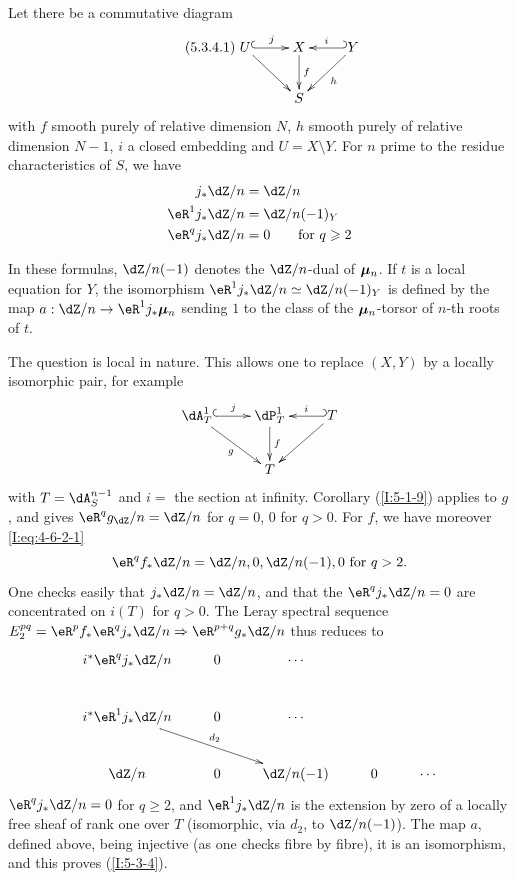 \begin{theorem}\label{I:5-3-4}
Let there be a commutative diagram
\begin{equation*}\tag{5.3.4.1}\label{I:eq:5-3-4-1}\xymatrix{
  U \ar@{^{(}->}[r]^-j \ar[dr]
    & X \ar[d]^-f
    & \ar@{_{(}->}[l]_-i Y \ar[dl]^-h \\
  & S
}\end{equation*}
with $f$ smooth purely of relative dimension $N$, $h$ smooth purely of
relative dimension $N-1$, $i$ a closed embedding and $U=X\setminus Y$. For
$n$ prime to the residue characteristics of $S$, we have
\begin{equation*}
\begin{aligned}
  j_* \dZ/n     &= \dZ/n \\
  \eR^1 j_*\dZ/n &= \dZ/n(-1)_Y \\
  \eR^q j_*\dZ/n &= 0 \qquad \text{for $q\geqslant 2$}
\end{aligned}
\end{equation*}
\end{theorem}

In these formulas, $\dZ/n(-1)$ denotes the $\dZ/n$-dual of ${\bm\mu}_n$. If $t$
is a local equation for $Y$, the isomorphism
$\eR^1j_*\dZ/n\simeq\dZ/n(-1)_Y$ is defined by the map
$a:\dZ/n\to \eR^1j_*\dmu_n$ sending $1$ to the class of the ${\bm\mu}_n$-torsor of
$n$-th roots of $t$.

The question is local in nature. This allows one to replace $(X,Y)$ by a
locally isomorphic pair, for example
\[\xymatrix{
  \dA_T^1 \ar@{^{(}->}[r]^-j \ar[dr]_-g
    & \dP_T^1 \ar[d]^-f
    & \ar@{_{(}->}[l]_-i T \ar[dl] \\
  & T
}\]
with $T=\dA_S^{n-1}$ and $i=$ the section at infinity. Corollary (\ref{I:5-1-9})
applies to $g$, and gives $\eR^q g_ \dZ/n=\dZ/n$ for $q=0$, $0$ for $q>0$.
For $f$, we have moreover \eqref{I:eq:4-6-2-1}
\[
  \eR^q f_* \dZ/n = \dZ/n,0,\dZ/n(-1),0 \text{ for $q>2$.}
\]
One checks easily that $j_* \dZ/n = \dZ/n$, and that the $\eR^q j_*\dZ/n = 0$
are concentrated on $i(T)$ for $q>0$. The Leray spectral sequence
$E_2^{pq} = \eR^p f_* \eR^q j_*\dZ/n \Rightarrow \eR^{p+q}g_* \dZ/n$ thus reduces
to
\[\xymatrix{
  i^* \eR^q j_* \dZ/n & 0 & \cdots \\
  i^* \eR^1 j_* \dZ/n \ar[drr]^-{d_2} & 0 & \cdots \\
  \dZ/n              & 0 & \dZ/n(-1) & 0 & \cdots
}\]
$\eR^q j_*\dZ/n=0$ for $q\geqslant 2$, and $\eR^1 j_*\dZ/n$ is the extension
by zero of a locally free sheaf of rank one over $T$ (isomorphic, via
$d_2$, to $\dZ/n(-1)$). The map $a$, defined above, being
injective (as one checks fibre by fibre), it is an isomorphism, and
this proves (\ref{I:5-3-4}). 





